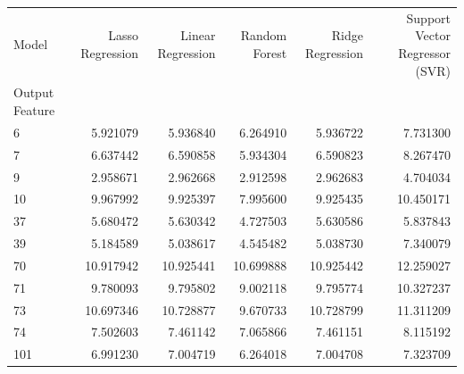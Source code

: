 \begin{tabular}{lrrrrr}
\toprule
Model & Lasso Regression & Linear Regression & Random Forest & Ridge Regression & Support Vector Regressor (SVR) \\
Output Feature &  &  &  &  &  \\
\midrule
6 & 5.921079 & 5.936840 & 6.264910 & 5.936722 & 7.731300 \\
7 & 6.637442 & 6.590858 & 5.934304 & 6.590823 & 8.267470 \\
9 & 2.958671 & 2.962668 & 2.912598 & 2.962683 & 4.704034 \\
10 & 9.967992 & 9.925397 & 7.995600 & 9.925435 & 10.450171 \\
37 & 5.680472 & 5.630342 & 4.727503 & 5.630586 & 5.837843 \\
39 & 5.184589 & 5.038617 & 4.545482 & 5.038730 & 7.340079 \\
70 & 10.917942 & 10.925441 & 10.699888 & 10.925442 & 12.259027 \\
71 & 9.780093 & 9.795802 & 9.002118 & 9.795774 & 10.327237 \\
73 & 10.697346 & 10.728877 & 9.670733 & 10.728799 & 11.311209 \\
74 & 7.502603 & 7.461142 & 7.065866 & 7.461151 & 8.115192 \\
101 & 6.991230 & 7.004719 & 6.264018 & 7.004708 & 7.323709 \\
\bottomrule
\end{tabular}
